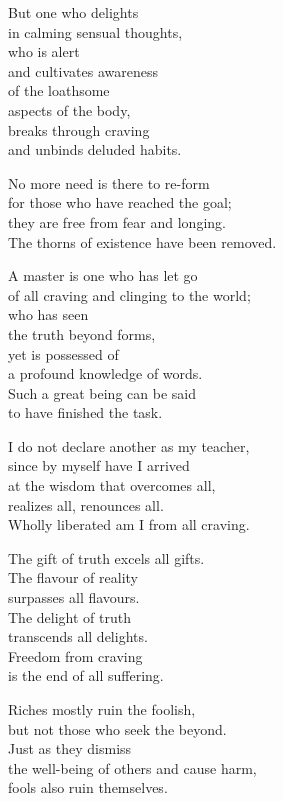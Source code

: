 But one who delights\\
in calming sensual thoughts,\\
who is alert\\
and cultivates awareness\\
of the loathsome\\
aspects of the body,\\
breaks through craving\\
and unbinds deluded habits.


No more need is there to re-form\\
for those who have reached the goal;\\
they are free from fear and longing.\\
The thorns of existence have been removed.


A master is one who has let go\\
of all craving and clinging to the world;\\
who has seen\\
the truth beyond forms,\\
yet is possessed of\\
a profound knowledge of words.\\
Such a great being can be said\\
to have finished the task.


I do not declare another as my teacher,\\
since by myself have I arrived\\
at the wisdom that overcomes all,\\
realizes all, renounces all.\\
Wholly liberated am I from all craving.


The gift of truth excels all gifts.\\
The flavour of reality\\
surpasses all flavours.\\
The delight of truth\\
transcends all delights.\\
Freedom from craving\\
is the end of all suffering.


Riches mostly ruin the foolish,\\
but not those who seek the beyond.\\
Just as they dismiss\\
the well-being of others and cause harm,\\
fools also ruin themselves.


